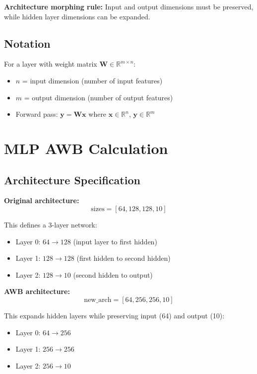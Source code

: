 \documentclass[11pt]{article}
\begin{document}
\textbf{Architecture morphing rule:} Input and output dimensions must be preserved, while hidden layer dimensions can be expanded.

\subsection{Notation}

For a layer with weight matrix $\mathbf{W} \in \mathbb{R}^{m \times n}$:
\begin{itemize}
    \item $n$ = input dimension (number of input features)
    \item $m$ = output dimension (number of output features)
    \item Forward pass: $\mathbf{y} = \mathbf{W}\mathbf{x}$ where $\mathbf{x} \in \mathbb{R}^n$, $\mathbf{y} \in \mathbb{R}^m$
\end{itemize}

\newpage

\section{MLP AWB Calculation}

\subsection{Architecture Specification}

\textbf{Original architecture:}
\begin{equation}
\text{sizes} = [64, 128, 128, 10]
\end{equation}

This defines a 3-layer network:
\begin{itemize}
    \item Layer 0: $64 \rightarrow 128$ (input layer to first hidden)
    \item Layer 1: $128 \rightarrow 128$ (first hidden to second hidden)
    \item Layer 2: $128 \rightarrow 10$ (second hidden to output)
\end{itemize}

\textbf{AWB architecture:}
\begin{equation}
\text{new\_arch} = [64, 256, 256, 10]
\end{equation}

This expands hidden layers while preserving input (64) and output (10):
\begin{itemize}
    \item Layer 0: $64 \rightarrow 256$
    \item Layer 1: $256 \rightarrow 256$
    \item Layer 2: $256 \rightarrow 10$
\end{itemize}
\end{document}
